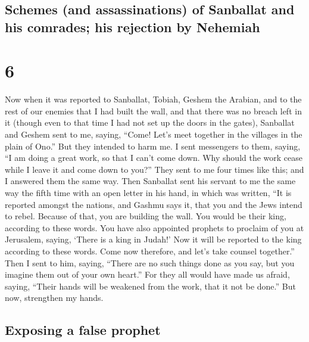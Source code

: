 \hypertarget{schemes-and-assassinations-of-sanballat-and-his-comrades-his-rejection-by-nehemiah}{%
\subsection{Schemes (and assassinations) of Sanballat and his comrades;
his rejection by
Nehemiah}\label{schemes-and-assassinations-of-sanballat-and-his-comrades-his-rejection-by-nehemiah}}

\hypertarget{section-5}{%
\section{6}\label{section-5}}

 Now when it was reported to Sanballat, Tobiah, Geshem the
Arabian, and to the rest of our enemies that I had built the wall, and
that there was no breach left in it (though even to that time I had not
set up the doors in the gates),  Sanballat and Geshem sent
to me, saying, ``Come! Let's meet together in the villages in the plain
of Ono.'' But they intended to harm me.  I sent messengers
to them, saying, ``I am doing a great work, so that I can't come down.
Why should the work cease while I leave it and come down to you?''
 They sent to me four times like this; and I answered them
the same way.  Then Sanballat sent his servant to me the
same way the fifth time with an open letter in his hand, 
in which was written, ``It is reported amongst the nations, and Gashmu
says it, that you and the Jews intend to rebel. Because of that, you are
building the wall. You would be their king, according to these words.
 You have also appointed prophets to proclaim of you at
Jerusalem, saying, `There is a king in Judah!' Now it will be reported
to the king according to these words. Come now therefore, and let's take
counsel together.''  Then I sent to him, saying, ``There
are no such things done as you say, but you imagine them out of your own
heart.''  For they all would have made us afraid, saying,
``Their hands will be weakened from the work, that it not be done.'' But
now, strengthen my hands.

\hypertarget{exposing-a-false-prophet}{%
\subsection{Exposing a false prophet}\label{exposing-a-false-prophet}}

